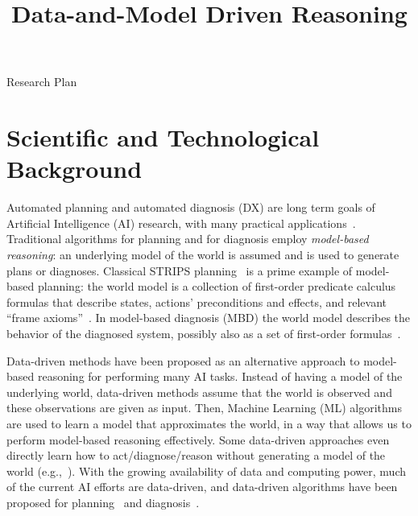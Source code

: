 \documentclass[12pt]{article}
\newcommand{\note}[1]{\textbf{\textit{#1}}}
\begin{document}
\title{Data-and-Model Driven Reasoning}

\begin{center}
\LARGE{Research Plan}
\end{center}

\section{Scientific and Technological Background}


Automated planning and automated diagnosis (DX) are long term goals of Artificial Intelligence (AI) research, with many practical applications~\cite{williams96,niggemann10model,Zamir2014UsingMD,abreu2011simultaneousDebugging,ruml2011line,fox2011automatic,robinson2014cost}. Traditional algorithms for planning and for diagnosis employ {\em model-based reasoning}: an underlying model of the world is assumed and is used to generate plans or diagnoses. Classical STRIPS planning~\cite{fikes1971strips} is a prime example of model-based planning: the world model is a collection of first-order predicate calculus formulas that describe states, actions' preconditions and effects, and relevant ``frame axioms''~\cite{ghallab2004automated}. In model-based diagnosis (MBD) the world model describes the behavior of the diagnosed system, 
possibly also as a set of first-order formulas~\cite{reiter1987theory,deKleer1987diagnosing}. 



Data-driven methods have been proposed as an alternative approach to model-based reasoning for performing many AI tasks. %
Instead of having a model of the underlying world, data-driven methods  assume that the world is observed and these observations are given as input. Then, Machine Learning (ML) algorithms are used to learn a model that approximates the world, in a way that allows us to perform model-based reasoning effectively. Some data-driven approaches even directly learn how to act/diagnose/reason without generating a model of the world (e.g.,~\cite{kearns2002POMDPsample}). 
With the growing availability of data and computing power, much of the current AI efforts are data-driven,
and data-driven algorithms have been proposed for  planning~\cite{fern2011first,juba2016jmlr} and diagnosis~\cite{keren2011model,qin2012survey}.
\end{document}
